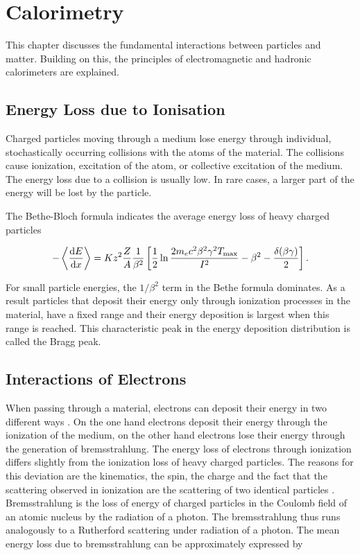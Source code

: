 \documentclass[12pt, a4paper]{thesis}
\begin{document}
\chapter{Calorimetry}
\label{sec:org802b29d}

This chapter discusses the fundamental interactions between particles
and matter. Building on this, the principles of electromagnetic and
hadronic calorimeters are explained.

\section{Energy Loss due to Ionisation}
\label{sec:org57bbfcf}

Charged particles moving through a medium lose energy through
individual, stochastically occurring collisions with the atoms of the
material. The collisions cause ionization, excitation of the atom, or
collective excitation of the medium.  The energy loss due to a
collision is usually low. In rare cases, a larger part of the energy
will be lost by the particle.

The Bethe-Bloch formula indicates the average energy loss of heavy
charged particles

\begin{align}
  -\expval{\dv{E}{x}} = K z^2 \frac{Z}{A} \frac{1}{\beta^{2}} \left[ \frac{1}{2} \ln{\frac{2 m_{e} c^{2} \beta^{2} \gamma^{2} T_{\text{max}}}{I^{2}}}-\beta^{2} - \frac{\delta(\beta\gamma)}{2}\right].
\end{align}

For small particle energies, the \(1/\beta^2\) term in the Bethe
formula dominates. As a result particles that deposit their energy
only through ionization processes in the material, have a fixed range
and their energy deposition is largest when this range is
reached. This characteristic peak in the energy deposition
distribution is called the Bragg peak.

\clearpage
\section{Interactions of Electrons}
\label{sec:org978e80c}

When passing through a material, electrons can deposit their energy in
two different ways \cite{kolanoski16}. On the one hand electrons
deposit their energy through the ionization of the medium, on the
other hand electrons lose their energy through the generation of
bremsstrahlung.  The energy loss of electrons through ionization
differs slightly from the ionization loss of heavy charged
particles. The reasons for this deviation are the kinematics, the
spin, the charge and the fact that the scattering observed in
ionization are the scattering of two identical particles
\cite{PhysRevD.98.030001}.  Bremsstrahlung is the loss of energy of
charged particles in the Coulomb field of an atomic nucleus by the
radiation of a photon. The bremsstrahlung thus runs analogously to a
Rutherford scattering under radiation of a photon.  The mean energy
loss due to bremsstrahlung can be approximately expressed by
\end{document}
